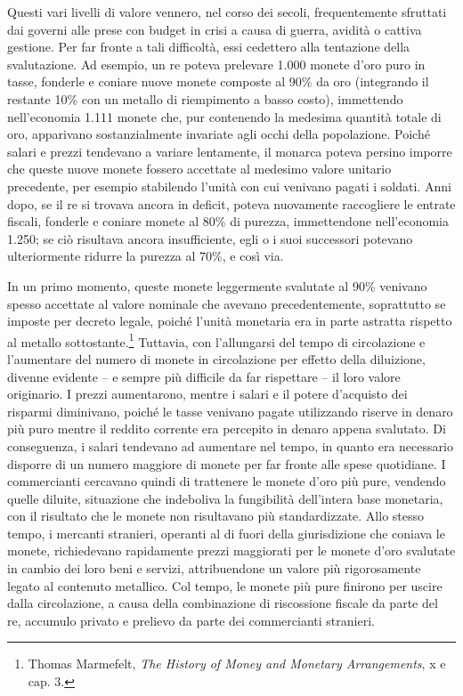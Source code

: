\documentclass[
  a5paper,
  smalldemyvopaper,10pt,twoside,onecolumn,openright,extrafontsizes,hidelinks]{memoir}
\begin{document}
Questi vari livelli di valore vennero, nel corso dei secoli,
frequentemente sfruttati dai governi alle prese con budget in crisi a
causa di guerra, avidità o cattiva gestione. Per far fronte a tali
difficoltà, essi cedettero alla tentazione della svalutazione. Ad
esempio, un re poteva prelevare 1.000 monete d'oro puro in tasse,
fonderle e coniare nuove monete composte al 90\% da oro (integrando il
restante 10\% con un metallo di riempimento a basso costo), immettendo
nell'economia 1.111 monete che, pur contenendo la medesima quantità
totale di oro, apparivano sostanzialmente invariate agli occhi della
popolazione. Poiché salari e prezzi tendevano a variare lentamente, il
monarca poteva persino imporre che queste nuove monete fossero accettate
al medesimo valore unitario precedente, per esempio stabilendo l'unità
con cui venivano pagati i soldati. Anni dopo, se il re si trovava ancora
in deficit, poteva nuovamente raccogliere le entrate fiscali, fonderle e
coniare monete al 80\% di purezza, immettendone nell'economia 1.250; se
ciò risultava ancora insufficiente, egli o i suoi successori potevano
ulteriormente ridurre la purezza al 70\%, e così via.

In un primo momento, queste monete leggermente svalutate al 90\%
venivano spesso accettate al valore nominale che avevano
precedentemente, soprattutto se imposte per decreto legale, poiché
l'unità monetaria era in parte astratta rispetto al metallo
sottostante.\footnote{Thomas Marmefelt, \emph{The History of Money and
  Monetary Arrangements}, x e cap. 3.} Tuttavia, con l'allungarsi del
tempo di circolazione e l'aumentare del numero di monete in circolazione
per effetto della diluizione, divenne evidente -- e sempre più difficile
da far rispettare -- il loro valore originario. I prezzi aumentarono,
mentre i salari e il potere d'acquisto dei risparmi diminivano, poiché
le tasse venivano pagate utilizzando riserve in denaro più puro mentre
il reddito corrente era percepito in denaro appena svalutato. Di
conseguenza, i salari tendevano ad aumentare nel tempo, in quanto era
necessario disporre di un numero maggiore di monete per far fronte alle
spese quotidiane. I commercianti cercavano quindi di trattenere le
monete d'oro più pure, vendendo quelle diluite, situazione che
indeboliva la fungibilità dell'intera base monetaria, con il risultato
che le monete non risultavano più standardizzate. Allo stesso tempo, i
mercanti stranieri, operanti al di fuori della giurisdizione che coniava
le monete, richiedevano rapidamente prezzi maggiorati per le monete
d'oro svalutate in cambio dei loro beni e servizi, attribuendone un
valore più rigorosamente legato al contenuto metallico. Col tempo, le
monete più pure finirono per uscire dalla circolazione, a causa della
combinazione di riscossione fiscale da parte del re, accumulo privato e
prelievo da parte dei commercianti stranieri.
\end{document}
